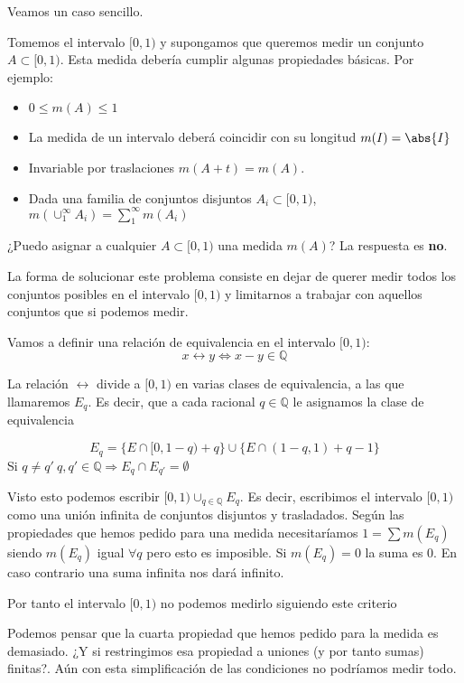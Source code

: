 \documentclass{apuntes}
\begin{document}
Veamos un caso sencillo.
\begin{example}
Tomemos el intervalo $[0,1)$ y supongamos que queremos medir un conjunto $A\subset [0,1)$. Esta medida debería cumplir algunas propiedades básicas. Por ejemplo:
\begin{itemize}
\item $0\leq m(A) \leq 1$
\item La medida de un intervalo deberá coincidir con su longitud $m(I)=\abs{I}$
\item Invariable por traslaciones $m(A+t) = m(A)$.
\item Dada una familia de conjuntos disjuntos $A_i\subset [0,1)$, $m(\cup_{1}^{\infty} A_i) = \sum_{1}^{\infty}m(A_i)$
\end{itemize}

¿Puedo asignar a cualquier $A \subset [0,1)$ una medida $m(A)$? La respuesta es \textbf{no}.

La forma de solucionar este problema consiste en dejar de querer medir todos los conjuntos posibles en el intervalo $[0,1)$ y limitarnos a trabajar con aquellos conjuntos que si podemos medir.

Vamos a definir una relación de equivalencia en el intervalo $[0,1)$: \[ x\rel y \iff x-y \in\mathbb{Q} \]

La relación $\rel$ divide a $[0,1)$ en varias clases de equivalencia, a las que llamaremos $E_q$. Es decir, que a cada racional $q ∈ ℚ$ le asignamos la clase de equivalencia

\[E_q = \lbrace E\cap [0, 1-q) +q \rbrace \cup \lbrace E\cap (1-q, 1) + q - 1\rbrace\]
Si $q \neq q' \ q,q'\in \mathbb{Q} \Rightarrow E_q\cap E_{q'} = \emptyset$

Visto esto podemos escribir $[0,1)\cup_{q\in \mathbb{Q}}E_q$. Es decir, escribimos el intervalo $[0,1)$ como una unión infinita de conjuntos disjuntos y trasladados. Según las propiedades que hemos pedido para una medida necesitaríamos $1 = \sum m(E_q)$ siendo $m(E_q)$ igual $\forall q$  pero esto es imposible. Si $m(E_q) = 0$ la suma es 0. En caso contrario una suma infinita nos dará infinito.

Por tanto el intervalo $[0,1)$ no podemos medirlo siguiendo este criterio

\end{example}

Podemos pensar que la cuarta propiedad que hemos pedido para la medida es demasiado. ¿Y si restringimos esa propiedad a uniones (y por tanto sumas) finitas?. Aún con esta simplificación de las condiciones no podríamos medir todo.
\end{document}
